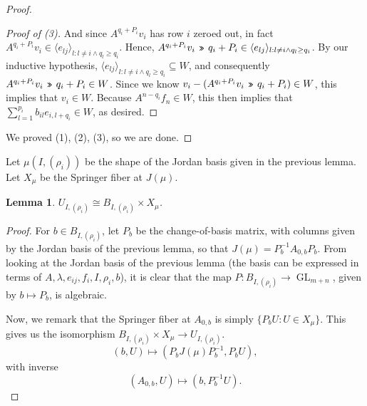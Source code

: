\documentclass[12pt,psamsfonts]{article}
\newcommand{\leftshift}{\,\texttt{<<}\,}
\newcommand{\rightshift}{\mathbin{\rotatebox[origin=c]{180}{\leftshift}}}
\DeclareMathOperator{\GL}{GL}
\newtheorem{lemma}[theorem]{Lemma}
\begin{document}
\begin{proof}
\begin{proof}[Proof of (3)]
        And since \(A^{q_i + P_i} v_i\) has row \(i\) zeroed out, in fact \(A^{q_i + P_i} v_i \in \langle e_{lj} \rangle_{l : l \neq i \land q_l \geq q_i}\).
        Hence, \(A^{q_i + P_i} v_i \rightshift q_i + P_i \in \langle e_{lj} \rangle_{l : l \neq i \land q_l \geq q_i}\).
        By our inductive hypothesis, \(\langle e_{lj} \rangle_{l : l \neq i \land q_l \geq q_i} \subseteq W\), and consequently \(A^{q_i + P_i} v_i \rightshift q_i + P_i \in W\).
        Since we know \(v_i - (A^{q_i + P_i} v_i \rightshift q_i + P_i) \in W\), this implies that \(v_i \in W\).
        Because \(A^{n - q_i} f_n \in W\), this then implies that \(\sum_{l = 1}^{p_i} b_{il} e_{i,l + q_i} \in W\), as desired.
    \end{proof}
    We proved (1), (2), (3), so we are done.
\end{proof}

Let \(\mu(I, (\rho_i))\) be the shape of the Jordan basis given in the previous lemma.
Let \(X_\mu\) be the Springer fiber at \(J(\mu)\).

\begin{lemma}
    \(U_{I, (\rho_i)} \cong B_{I, (\rho_i)} \times X_\mu\).
\end{lemma}
\begin{proof}
    For \(b \in B_{I, (\rho_i)}\), let \(P_b\) be the change-of-basis matrix, with columns given by the Jordan basis of the previous lemma, so that \(J(\mu) = P_b^{-1} A_{0,b} P_b\).
    From looking at the Jordan basis of the previous lemma (the basis can be expressed in terms of \(A, \lambda, e_{ij}, f_i, I, \rho_i, b\)), it is clear that the map \(P : B_{I, (\rho_i)} \to \GL_{m + n}\), given by \(b \mapsto P_b\), is algebraic.
    \par Now, we remark that the Springer fiber at \(A_{0,b}\) is simply \(\{P_b U : U \in X_\mu\}\).
    This gives us the isomorphism \(B_{I, (\rho_i)} \times X_\mu \to U_{I, (\rho_i)}\).
    \[(b, U) \mapsto (P_b J(\mu) P_b^{-1}, P_b U),\]
    with inverse
    \[(A_{0,b}, U) \mapsto (b, P_b^{-1} U).\]
\end{proof}
\end{document}

